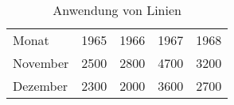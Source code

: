 \begin{table}[th]
  \centering
  \footnotesize
  \caption{Anwendung von Linien}
  \label{tab:tabelle2}
  \begin{tabular}{@{}l*{4}{d{4.0}}@{}}
    \toprule
      Monat & 1965 & 1966 & 1967 & 1968 \\
    \cmidrule(r){1-1}\cmidrule(lr){2-2}\cmidrule(lr){3-3}\cmidrule(lr){4-4}%
      \cmidrule(l){5-5}
      November  & 2500 & 2800 & 4700 & 3200 \\
      Dezember  & 2300 & 2000 & 3600 & 2700 \\
    \bottomrule
  \end{tabular}
\end{table}